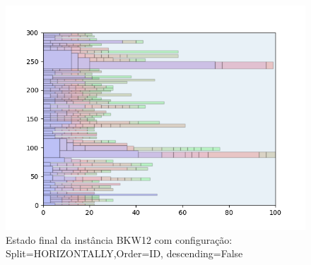 \begin{figure}[H]
    \centering
    \caption[]{Estado final da instância BKW12 com configuração: Split=HORIZONTALLY,Order=ID, descending=False}
    \label{fig:bkw12-horizontally-id-false}
    \includegraphics[scale=0.5]{output/figures/bkw/bkw12/horizontally/id/false/000}
\end{figure}